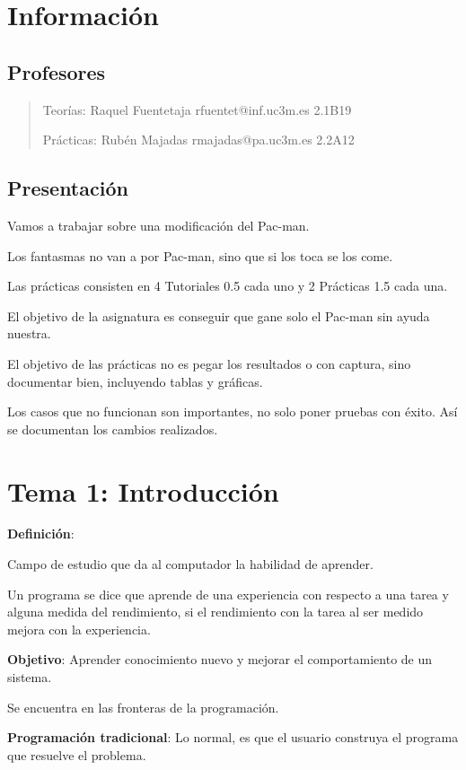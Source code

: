 \documentclass[12pt, twoside, openright]{report} %
\begin{document}
\chapter{Información}
\section{Profesores}

\begin{quote}
	Teorías: Raquel Fuentetaja rfuentet@inf.uc3m.es 2.1B19

	Prácticas: Rubén Majadas rmajadas@pa.uc3m.es 2.2A12
\end{quote}

\section{Presentación}

Vamos a trabajar sobre una modificación del Pac-man.

Los fantasmas no van a por Pac-man, sino que si los toca se los come.

Las prácticas consisten en 4 Tutoriales 0.5 cada uno y 2 Prácticas 1.5 cada una.

El objetivo de la asignatura es conseguir que gane solo el Pac-man sin ayuda nuestra.

El objetivo de las prácticas no es pegar los resultados o con captura, sino documentar bien, incluyendo tablas y gráficas.

Los casos que no funcionan son importantes, no solo poner pruebas con éxito. Así se documentan los cambios realizados.


\chapter{Tema 1: Introducción}

\textbf{Definición}:

Campo de estudio que da al computador la habilidad de aprender.

Un programa se dice que aprende de una experiencia con respecto a una tarea y alguna medida del rendimiento, si el rendimiento con la tarea al ser medido mejora con la experiencia.

\textbf{Objetivo}: Aprender conocimiento nuevo y mejorar el comportamiento de un sistema.

Se encuentra en las fronteras de la programación.

\textbf{Programación tradicional}: Lo normal, es que el usuario construya el programa que resuelve el problema.
\end{document}
